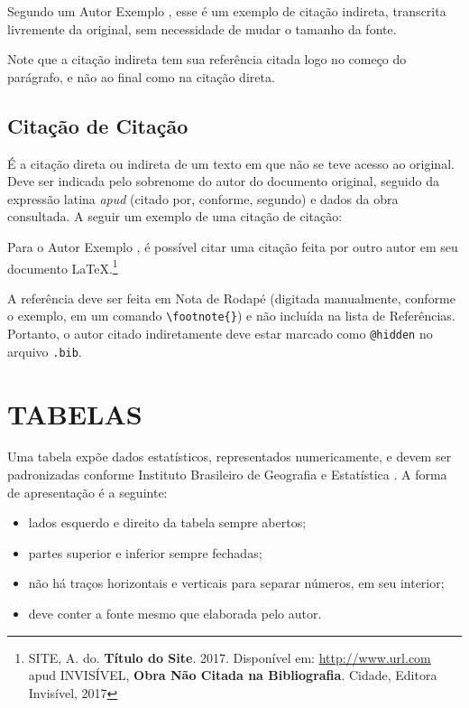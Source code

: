 \documentclass[
  12pt,		%
  a4paper,	%
  openright,%
  oneside,	%
  chapter=TITLE,		%
  section=TITLE,		%
  english,	%
  french,	%
  spanish,	%
  brazil
]{abntex2}
\begin{document}
            Segundo um Autor Exemplo \cite{livro}, esse é um exemplo de citação indireta, transcrita livremente da original, sem necessidade de mudar o tamanho da fonte.
            
            Note que a citação indireta tem sua referência citada logo no começo do parágrafo, e não ao final como na citação direta.
            
        \subsection{Citação de Citação}
            
            É a citação direta ou indireta de um texto em que não se teve acesso ao original. Deve ser indicada pelo sobrenome do autor do documento original, seguido da expressão latina \textit{apud} (citado por, conforme, segundo) e dados da obra consultada. A seguir um exemplo de uma citação de citação:
            
            Para o Autor Exemplo , é possível citar uma citação feita por outro autor em seu documento \LaTeX.\footnote{SITE, A. do. \textbf{Título do Site}. 2017. Disponível em: \url{http://www.url.com} apud INVISÍVEL, \textbf{Obra Não Citada na Bibliografia}. Cidade, Editora Invisível, 2017}
            
            A referência deve ser feita em Nota de Rodapé (digitada manualmente, conforme o exemplo, em um comando \verb|\footnote{}|) e não incluída na lista de Referências. Portanto, o autor citado indiretamente deve estar marcado como \verb|@hidden| no arquivo \verb|.bib|. 
         
         
         \section{TABELAS}
         
         Uma tabela expõe dados estatísticos, representados numericamente, e devem ser padronizadas conforme Instituto Brasileiro de Geografia e Estatística \cite{ibge1993}. A forma de apresentação é a seguinte: 
                \begin{itemize}
                    \item lados esquerdo e direito da tabela sempre abertos;
                    \item partes superior e inferior sempre fechadas;
                    \item não há traços horizontais e verticais para separar números, em seu interior;
                    \item deve conter a fonte mesmo que elaborada pelo autor.
                \end{itemize}
                
\end{document}
